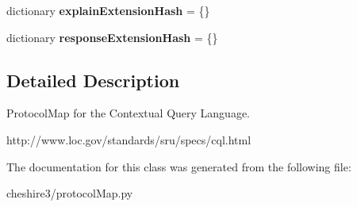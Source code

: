 \begin{DoxyCompactItemize}
\item 
\hypertarget{classcheshire3_1_1protocol_map_1_1_c_q_l_protocol_map_ade036db5e6285147d94f8f8e573649ba}{dictionary {\bfseries explain\-Extension\-Hash} = \{\}}\label{classcheshire3_1_1protocol_map_1_1_c_q_l_protocol_map_ade036db5e6285147d94f8f8e573649ba}

\item 
\hypertarget{classcheshire3_1_1protocol_map_1_1_c_q_l_protocol_map_a9a736596c578a3d5b43659f467e53fc4}{dictionary {\bfseries response\-Extension\-Hash} = \{\}}\label{classcheshire3_1_1protocol_map_1_1_c_q_l_protocol_map_a9a736596c578a3d5b43659f467e53fc4}

\end{DoxyCompactItemize}


\subsection{Detailed Description}
\begin{DoxyVerb}ProtocolMap for the Contextual Query Language.

http://www.loc.gov/standards/sru/specs/cql.html
\end{DoxyVerb}
 

The documentation for this class was generated from the following file\-:\begin{DoxyCompactItemize}
\item 
cheshire3/protocol\-Map.\-py\end{DoxyCompactItemize}
